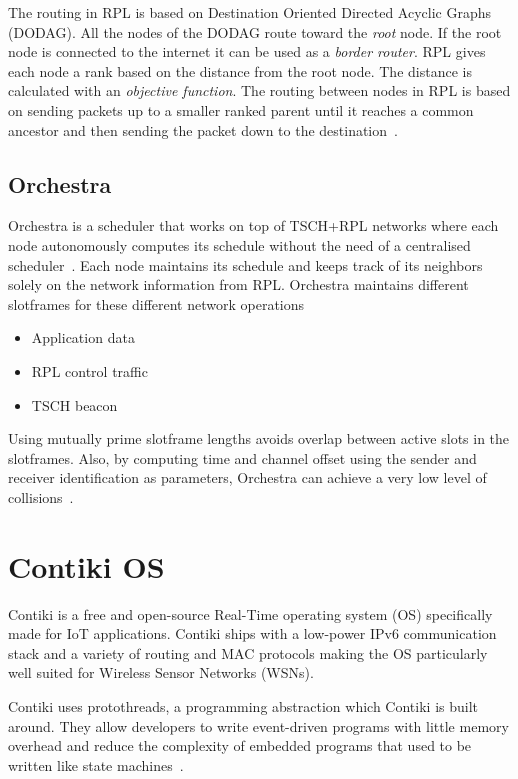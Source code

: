 The routing in RPL is based on Destination Oriented Directed Acyclic Graphs (DODAG).
All the nodes of the DODAG route toward the \emph{root} node. 
If the root node is connected to the internet it can be used as a \emph{border
router}.
RPL gives each node a rank based on the distance from the root node. 
The distance is calculated with an \emph{objective function}.
The routing between nodes in RPL is based on sending packets up to a smaller 
ranked parent until it reaches a common ancestor and then sending the packet down
to the destination~\cite{duquennoy2015}.

\subsection{Orchestra}

Orchestra is a scheduler that works on top of TSCH+RPL
networks where each node autonomously computes its schedule without the
need of a centralised scheduler~\cite{duquennoy2015}.
Each node maintains its schedule and keeps track of its neighbors solely
on the network information from RPL.
Orchestra maintains different slotframes for these different network operations

\begin{itemize}
  \item Application data
  \item RPL control traffic
  \item TSCH beacon
\end{itemize}

Using mutually prime slotframe lengths avoids overlap between active slots in
the slotframes. 
Also, by computing time and channel offset using the sender and receiver
identification as parameters, Orchestra can achieve a very low level of
collisions~\cite{duquennoy2015}.

\section{Contiki OS}

Contiki is a free and open-source Real-Time operating system (OS) specifically made
for IoT applications. Contiki ships with a low-power IPv6 communication stack
and a variety of routing and MAC protocols making the OS particularly well
suited for Wireless Sensor Networks (WSNs).

Contiki uses protothreads, a programming abstraction which Contiki is
built around.
They allow developers to write event-driven programs with little memory overhead and
reduce the complexity of embedded programs that used to be written 
like state machines~\cite{10.1145/1182807.1182811}.

